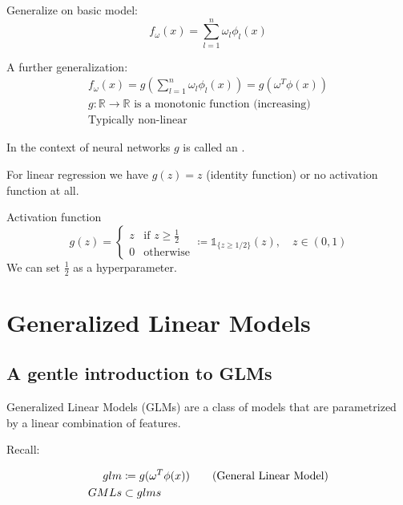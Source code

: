 Generalize on basic model:
\begin{equation}
	\boxed{f_\omega(x) = \sum_{l=1}^n \omega_l \phi_l(x)}
\end{equation}

A further generalization:
\begin{align*}
	f_\omega(x) = g\left(\sum_{l=1}^n \omega_l \phi_l(x)\right) = g\left(\omega^T\phi(x)\right) \\
	g: \mathds{R} \to \mathds{R} \text{ is a monotonic function (increasing)}                   \\
	\text{Typically non-linear}
\end{align*}

In the context of neural networks $g$ is called an .

For linear regression we have $g(z) = z$ (identity function) or
no activation function at all.

\begin{example}{Activation function}{}
\begin{equation*}
	g(z) = \begin{cases}
		z & \text{if } z \geq \frac{1}{2} \\
		0 & \text{otherwise}
	\end{cases}  \coloneqq \mathds{1}_{\{z \geq 1/2\}}(z), \quad z \in (0, 1)
\end{equation*}
\tcbline
We can set $\frac{1}{2}$ as a hyperparameter.
\end{example}

\section{Generalized Linear Models}
\subsection{A gentle introduction to GLMs}

Generalized Linear Models (GLMs) are a class of models that are
parametrized by a linear combination of features.

Recall:

\begin{align*}
	glm  & \coloneqq g(\omega^T\phi(x))  \tag{\text{General Linear Model}} \\
	GMLs & \subset glms
\end{align*}

\newcommand\hcancel[2][black]{\setbox0=\hbox{$#2$}%
	\rlap{\raisebox{.45\ht0}{\textcolor{#1}{\rule{\wd0}{1pt}}}}#2}


